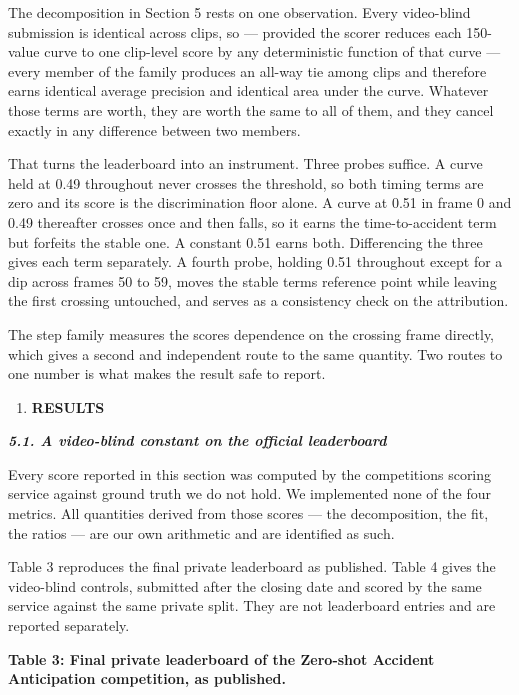 The decomposition in Section 5 rests on one observation. Every video-blind submission is identical across clips, so --- provided the scorer reduces each 150-value curve to one clip-level score by any deterministic function of that curve --- every member of the family produces an all-way tie among clips and therefore earns identical average precision and identical area under the curve. Whatever those terms are worth, they are worth the same to all of them, and they cancel exactly in any difference between two members.

That turns the leaderboard into an instrument. Three probes suffice. A curve held at 0.49 throughout never crosses the threshold, so both timing terms are zero and its score is the discrimination floor alone. A curve at 0.51 in frame 0 and 0.49 thereafter crosses once and then falls, so it earns the time-to-accident term but forfeits the stable one. A constant 0.51 earns both. Differencing the three gives each term separately. A fourth probe, holding 0.51 throughout except for a dip across frames 50 to 59, moves the stable term\textquotesingle s reference point while leaving the first crossing untouched, and serves as a consistency check on the attribution.

The step family measures the score\textquotesingle s dependence on the crossing frame directly, which gives a second and independent route to the same quantity. Two routes to one number is what makes the result safe to report.

\begin{enumerate}
\def\labelenumi{\arabic{enumi}.}
\setcounter{enumi}{3}
\item
  \textbf{RESULTS}
\end{enumerate}

\emph{\textbf{5.1. A video-blind constant on the official leaderboard}}

Every score reported in this section was computed by the competition\textquotesingle s scoring service against ground truth we do not hold. We implemented none of the four metrics. All quantities derived from those scores --- the decomposition, the fit, the ratios --- are our own arithmetic and are identified as such.

Table 3 reproduces the final private leaderboard as published. Table 4 gives the video-blind controls, submitted after the closing date and scored by the same service against the same private split. They are not leaderboard entries and are reported separately.

\textbf{Table 3: Final private leaderboard of the Zero-shot Accident Anticipation competition, as published.}

